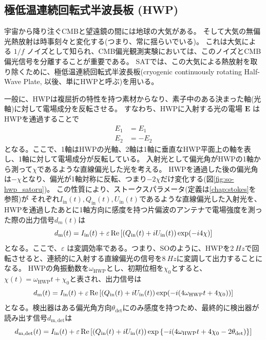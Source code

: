 \documentclass[../../main.tex]{subfiles}
\begin{document}
\subsection{極低温連続回転式半波長板 (HWP)}
\label{sec:HWP}
宇宙から降り注ぐCMBと望遠鏡の間には地球の大気がある。
そして大気の無偏光熱放射は時事刻々と変化する(つまり、常に揺らいでいる)。
これは大気による $1/f$ ノイズとして知られ、CMB偏光観測実験においては、このノイズとCMB偏光信号を分離することが重要である。
SATでは、この大気による熱放射を取り除くために、極低温連続回転式半波長板(cryogenic continuously rotating Half-Wave Plate, 以後、単にHWPと呼ぶ)を用いる\cite{so:hwp_yamada}。

一般に、HWPは複屈折の特性を持つ素材からなり、素子中のある決まった軸(光軸)に対して電場成分を反転させる。
すなわち、HWPに入射する光の電場 $\bm{E}$ はHWPを通過することで
\begin{align}
    E_{1} &= E_{1} \\
    E_{2} &= -E_{2}
\end{align}
となる。ここで、1軸はHWPの光軸、2軸は1軸に垂直なHWP平面上の軸を表し、1軸に対して電場成分が反転している。
入射光として偏光角がHWPの1軸から測って$\chi$であるような直線偏光した光を考える。
HWPを通過した後の偏光角は$-\chi$となり、偏光が1軸対称に反転、つまり$-2\chi$だけ変化する(図\ref{fig:so-hwp_satoru})。
この性質により、ストークスパラメータ(定義は\ref{chap:stokes}を参照)が
それぞれ$I_{\mathrm{in}}(t), Q_{\mathrm{in}}(t), U_{\mathrm{in}}(t)$であるような直線偏光した入射光を、
HWPを通過したあとに1軸方向に感度を持つ片偏波のアンテナで電場強度を測った際の出力信号$d_m(t)$は
\begin{equation}
    d_{\mathrm{m}}(t) = I_{\mathrm{in}}(t) + \varepsilon\Re\qty[\qty(Q_{\mathrm{in}}(t)+iU_{\mathrm{in}}(t))\exp(-i 4\chi)]
\end{equation}
となる。ここで、$\varepsilon$ は変調効率である。つまり、SOのように、HWPを$\SI{2}{Hz}$で回転させると、連続的に入射する直線偏光の信号を$\SI{8}{Hz}$に変調して出力することになる。
HWPの角振動数を$\omega_{\mathrm{HWP}}$とし、初期位相を$\chi_0$とすると、$\chi(t) = \omega_{\mathrm{HWP}}t + \chi_{0}$と表され、出力信号は
\begin{equation}
    d_{\mathrm{m}}(t) = I_{\mathrm{in}}(t) + \varepsilon\Re\qty[\qty(Q_{\mathrm{in}}(t)+iU_{\mathrm{in}}(t))\exp(-i \qty(4\omega_{\mathrm{HWP}}t + 4\chi_0))]
\end{equation}
となる。検出器はある偏光角方向$\theta_{\mathrm{det}}$にのみ感度を持つため、最終的に検出器が読み出す信号$d_{\mathrm{m}, \mathrm{det}}$は
\begin{equation}
    \label{eq:so-hwp_modulation}
    d_{\mathrm{m}, \mathrm{det}}(t) = I_{\mathrm{in}}(t) + \varepsilon\Re\qty[\qty(Q_{\mathrm{in}}(t)+iU_{\mathrm{in}}(t))\exp\qty{-i \qty(4\omega_{\mathrm{HWP}}t + 4\chi_0 - 2\theta_{\mathrm{det}})}]
\end{equation}
\end{document}
